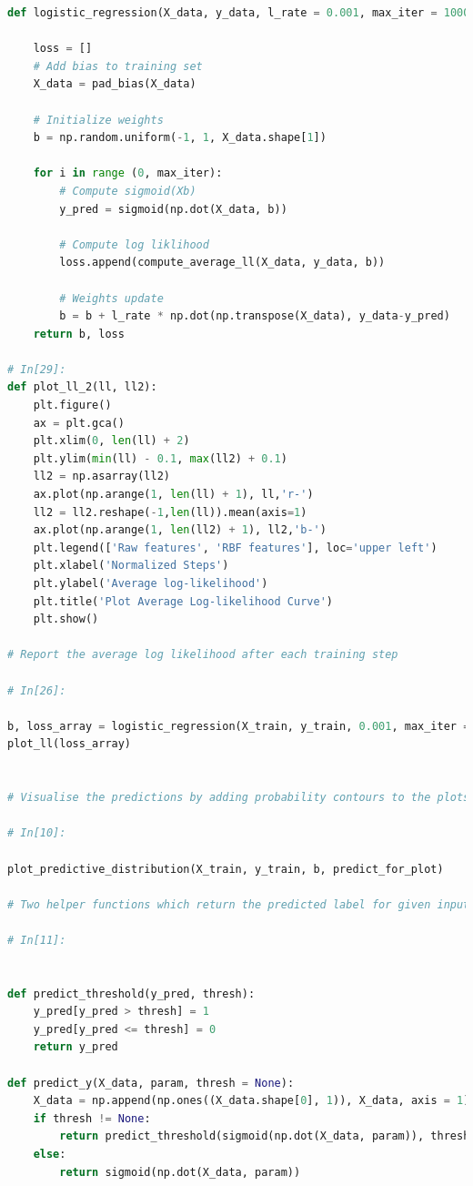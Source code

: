 \documentclass[journal]{IEEEtran}
\begin{document}
\begin{lstlisting}[language=Python]
def logistic_regression(X_data, y_data, l_rate = 0.001, max_iter = 1000):
    
    loss = []
    # Add bias to training set
    X_data = pad_bias(X_data)
    
    # Initialize weights
    b = np.random.uniform(-1, 1, X_data.shape[1])

    for i in range (0, max_iter):
        # Compute sigmoid(Xb)
        y_pred = sigmoid(np.dot(X_data, b))
        
        # Compute log liklihood
        loss.append(compute_average_ll(X_data, y_data, b))
        
        # Weights update
        b = b + l_rate * np.dot(np.transpose(X_data), y_data-y_pred)
    return b, loss

# In[29]:
def plot_ll_2(ll, ll2):
    plt.figure()
    ax = plt.gca()
    plt.xlim(0, len(ll) + 2)
    plt.ylim(min(ll) - 0.1, max(ll2) + 0.1)
    ll2 = np.asarray(ll2)
    ax.plot(np.arange(1, len(ll) + 1), ll,'r-')
    ll2 = ll2.reshape(-1,len(ll)).mean(axis=1)
    ax.plot(np.arange(1, len(ll2) + 1), ll2,'b-')
    plt.legend(['Raw features', 'RBF features'], loc='upper left')
    plt.xlabel('Normalized Steps')
    plt.ylabel('Average log-likelihood')
    plt.title('Plot Average Log-likelihood Curve')
    plt.show()

# Report the average log likelihood after each training step

# In[26]:

b, loss_array = logistic_regression(X_train, y_train, 0.001, max_iter = 20)
plot_ll(loss_array)


# Visualise the predictions by adding probability contours to the plots made in part c)

# In[10]:

plot_predictive_distribution(X_train, y_train, b, predict_for_plot)

# Two helper functions which return the predicted label for given input features and parameters, if *thresh* is set to a value, then for all probabilities above the threshold, the label returns 1, otherwise 0.

# In[11]:


def predict_threshold(y_pred, thresh):
    y_pred[y_pred > thresh] = 1
    y_pred[y_pred <= thresh] = 0
    return y_pred

def predict_y(X_data, param, thresh = None):
    X_data = np.append(np.ones((X_data.shape[0], 1)), X_data, axis = 1)
    if thresh != None:
        return predict_threshold(sigmoid(np.dot(X_data, param)), thresh)
    else:
        return sigmoid(np.dot(X_data, param))


\end{lstlisting}
\end{document}
